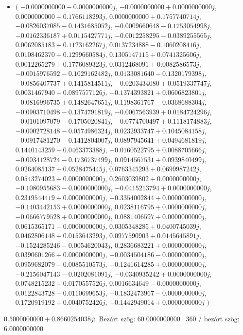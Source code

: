 \documentclass[14pt,a4paper]{article}
\begin{document}
\begin{itemize}
\item
$\big($
$-0.0000000000-0.0000000000j$, $-0.0000000000+0.0000000000j$, $0.0000000000+0.1766118293j$, $0.0000000000+0.1757740714j$, $-0.0826037085-0.1431685052j$, $-0.0009660648-0.1753054998j$, $-0.0162336187+0.0115427771j$, $-0.0012258295-0.0389255565j$, $0.0062085183+0.1123162267j$, $0.0137234888-0.1060208416j$, $0.0108462370+0.1299660584j$, $0.1305147115+0.0741325606j$, $0.0012265279+0.1776089323j$, $0.0312468091+0.0082586573j$, $-0.0015976592-0.1029162482j$, $0.0133081640-0.1320179398j$, $-0.0856407737+0.1415814511j$, $-0.0203434080+0.0519337747j$, $0.0031467940+0.0897577126j$, $-0.1374393821+0.0606823801j$, $-0.0816996735+0.1482647651j$, $0.1198361767-0.0368688304j$, $-0.0903710498-0.1374791819j$, $-0.0067563939+0.0184724296j$, $-0.0101097079-0.1705020841j$, $-0.0774700497+0.1118174883j$, $-0.0002728148-0.0574986324j$, $0.0232933747+0.1045084158j$, $-0.0917481270-0.1412804007j$, $0.0897945641+0.0494681819j$, $0.1440143259-0.0463373388j$, $-0.0160522795+0.0088705666j$, $-0.0034128724-0.1736737499j$, $0.0914567531+0.0939840499j$, $0.0264085137+0.0528475445j$, $0.0763345293+0.0699987242j$, $0.0543274023+0.0000000000j$, $0.2603039802+0.0000000000j$, $-0.1080955683-0.0000000000j$, $-0.0415213794+0.0000000000j$, $0.2319544419+0.0000000000j$, $-0.3354002844+0.0000000000j$, $-0.1403442153+0.0000000000j$, $0.0238116795+0.0000000000j$, $-0.0666779528+0.0000000000j$, $0.0881406597+0.0000000000j$, $0.0615365171-0.0000000000j$, $0.0305348285+0.0400745039j$, $0.0462806148+0.0153643293j$, $0.0977590903+0.0145645891j$, $-0.1524285246-0.0054620043j$, $0.2836683221+0.0000000000j$, $0.0390601266+0.0000000000j$, $-0.0034504186-0.0000000000j$, $0.0959682079-0.0085510573j$, $-0.1241614285+0.0000000000j$, $-0.2156047143-0.0202081091j$, $-0.0340935242+0.0000000000j$, $0.0748215232+0.0170557526j$, $0.0016634649-0.0000000000j$, $0.0122843728-0.0110699653j$, $-0.1832473967-0.0000000000j$, $0.1720919192+0.0040752426j$, $-0.1442949014+0.0000000000j$
$\big)$
\end{itemize}
$0.5000000000+0.8660254038j$:\
Bezárt szög: $60.0000000000$ \
360 / bezárt szög: $6.0000000000$\
\end{document}
